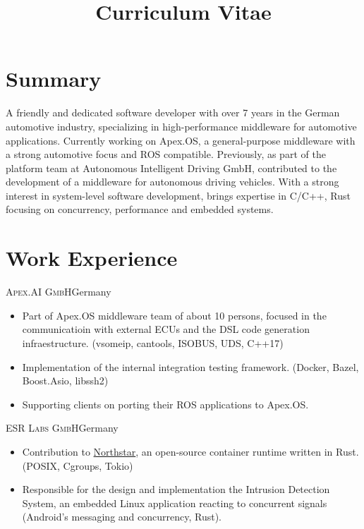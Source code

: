 \documentclass[10pt]{moderncv}
\title{Curriculum Vitae}
\begin{document}
\maketitle
\vspace*{-1cm}

\section{Summary}

A friendly and dedicated software developer with over 7 years in the German automotive industry, specializing in
high-performance middleware for automotive applications. Currently working on Apex.OS, a general-purpose middleware with a
strong automotive focus and ROS compatible. Previously, as part of the platform team at Autonomous Intelligent Driving GmbH,
contributed to the development of  a middleware for autonomous driving vehicles. With a strong interest in system-level software
development, brings expertise in C/C++, Rust focusing on concurrency, performance and embedded systems.

\section{Work Experience}

{\textsc{Apex.AI GmbH}}{Germany}{}{%
\begin{itemize}
    \item Part of Apex.OS middleware team of about 10 persons, focused in the communicatioin with external ECUs and the DSL code generation infraestructure. (vsomeip, cantools, ISOBUS, UDS, C++17)
    \item Implementation of the internal integration testing framework. (Docker, Bazel, Boost.Asio, libssh2)
    \item Supporting clients on porting their ROS applications to Apex.OS.
\end{itemize}
}

{\textsc{ESR Labs GmbH}}{Germany}{}{%
\begin{itemize}
    \item Contribution to \href{https://github.com/esrlabs/northstar}{Northstar}, an open-source container runtime written in
        Rust. (POSIX, Cgroups, Tokio)
    \item Responsible for the design and implementation the Intrusion Detection System, an embedded Linux application reacting
        to concurrent signals (Android's messaging and concurrency, Rust).
\end{itemize}
}
\end{document}
